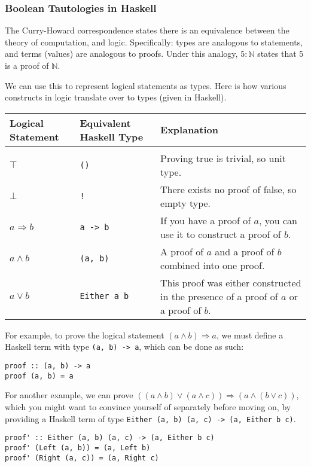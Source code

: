 \documentclass[12pt,twoside]{report}
\begin{document}
\subsubsection{Boolean Tautologies in Haskell}
The Curry-Howard correspondence states there is an equivalence between the theory of computation, and logic. Specifically: types are analogous to statements, and terms (values) are analogous to proofs. Under this analogy, $5 : \mathbb{N}$ states that $5$ is a proof of $\mathbb{N}$.

We can use this to represent logical statements as types. Here is how various constructs in logic translate over to types (given in Haskell).

\begin{tabularx}{\textwidth}{ X|X|X }
  Logical Statement & Equivalent Haskell Type & Explanation \\
  \hline \\
  $\top$ & \verb|()| & Proving true is trivial, so unit type. \\
  $\bot$ & \verb|!| & There exists no proof of false, so empty type. \\
  $a \Rightarrow b$ & \verb|a -> b| & If you have a proof of $a$, you can use it to construct a proof of $b$. \\
  $a \wedge b$ & \verb|(a, b)| & A proof of $a$ and a proof of $b$ combined into one proof. \\
  $a \vee b$ & \verb|Either a b| & This proof was either constructed in the presence of a proof of $a$ or a proof of $b$.
\end{tabularx}

For example, to prove the logical statement $(a \wedge b) \Rightarrow a$, we must define a Haskell term with type \verb|(a, b) -> a|, which can be done as such:

\begin{lstlisting}
proof :: (a, b) -> a
proof (a, b) = a
\end{lstlisting}

For another example, we can prove $((a \wedge b) \vee (a \wedge c)) \Rightarrow (a \wedge (b \vee c))$, which you might want to convince yourself of separately before moving on, by providing a Haskell term of type \verb|Either (a, b) (a, c) -> (a, Either b c)|.

\begin{lstlisting}
proof' :: Either (a, b) (a, c) -> (a, Either b c)
proof' (Left (a, b)) = (a, Left b)
proof' (Right (a, c)) = (a, Right c)
\end{lstlisting}
\end{document}
